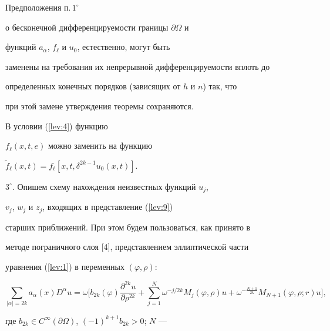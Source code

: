 \begin{note}


Предположения п.\,$1^\circ$


о бесконечной дифференцируемости границы $\partial\Omega$ и


функций $a_\alpha$, $f_\ell$ и $u_0$, естественно, могут быть


заменены на требования их непрерывной дифференцируемости вплоть до


определенных конечных порядков (зависящих от $h$ и $n$) так, что


при этой замене утверждения теоремы сохраняются.


\end{note}





\begin{note}


В условии (\ref{lev:4}) функцию


$f_\ell(x,t,e)$ можно заменить на функцию


$\widetilde{f}_\ell(x,t)=f_\ell[x,t,\delta^{2k-1}u_0(x,t)]$.


\end{note}





$3^\circ$. Опишем схему нахождения неизвестных функций $u_j$,


$v_j$, $w_j$ и $z_j$, входящих в представление (\ref{lev:9})


старших приближений. При этом будем пользоваться, как принято в


методе пограничного слоя [4], представлением эллиптической части


уравнения (\ref{lev:1}) в переменных $(\varphi,\rho)$:


\begin{equation}


\sum_{|\alpha|=2k} a_\alpha(x) D^\alpha u=


\omega\bigg[ b_{2k}(\varphi) \frac{\partial^{2k}u}{\partial \rho^{2k}}


+\sum_{j=1}^N \omega^{-j/2k} M_j(\varphi,\rho)u+


\omega^{-\frac{N+1}{2k}}M_{N+1}(\varphi,\rho;r)u \bigg],


\label{lev:10}


\end{equation}


где $b_{2k}\in C^\infty(\partial\Omega)$, $(-1)^{k+1}b_{2k}>0$; $N$ ---


